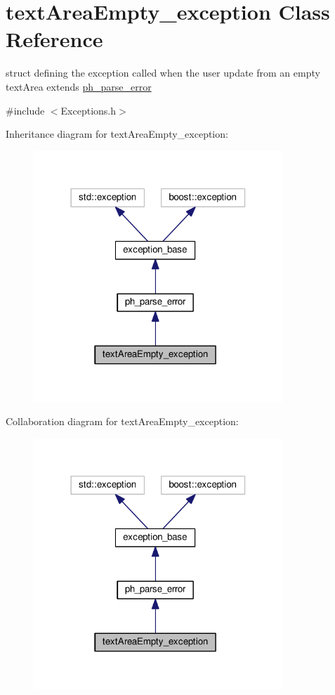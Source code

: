 \hypertarget{structtextAreaEmpty__exception}{\section{text\+Area\+Empty\+\_\+exception Class Reference}
\label{structtextAreaEmpty__exception}
}


struct defining the exception called when the user update from an empty text\+Area extends \hyperlink{structph__parse__error}{ph\+\_\+parse\+\_\+error}  




{\ttfamily \#include $<$Exceptions.\+h$>$}



Inheritance diagram for text\+Area\+Empty\+\_\+exception\+:\nopagebreak
\begin{figure}[H]
\begin{center}
\leavevmode
\includegraphics[width=266pt]{structtextAreaEmpty__exception__inherit__graph}
\end{center}
\end{figure}


Collaboration diagram for text\+Area\+Empty\+\_\+exception\+:\nopagebreak
\begin{figure}[H]
\begin{center}
\leavevmode
\includegraphics[width=266pt]{structtextAreaEmpty__exception__coll__graph}
\end{center}
\end{figure}


